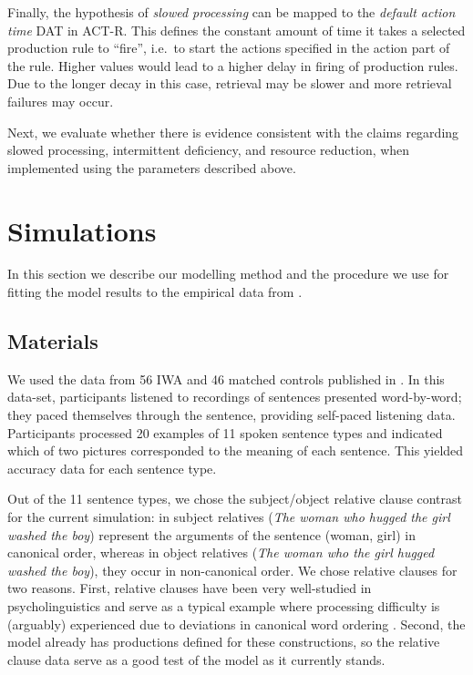\documentclass[10pt,letterpaper]{article}
\begin{document}
Finally, the hypothesis of \emph{slowed processing} can be mapped to the \emph{default action time} DAT in ACT-R. This defines the constant amount of time it takes a selected production rule to ``fire'', i.e.\ to start the actions specified in the action part of the rule. Higher values would lead to a higher delay in firing of production rules. Due to the longer decay in this case, retrieval may be slower and more retrieval failures may occur.

Next, we evaluate whether there is evidence consistent with the claims regarding slowed processing, intermittent deficiency, and resource reduction, when implemented using the parameters described above. 

\section{Simulations}

In this section we describe our modelling method and the procedure we use for fitting the model results to the empirical data from .

\subsection{Materials}

We used the data from 56 IWA and 46 matched controls published in . In this data-set, participants listened to recordings of sentences presented word-by-word; they paced themselves through the sentence, providing self-paced listening data. Participants processed 20 examples of 11 spoken sentence types and indicated which of two pictures corresponded to the meaning of each sentence. This yielded accuracy data for each sentence type. 

Out of the 11 sentence types, we chose the subject/object relative clause contrast for the current simulation:
in subject relatives (\textit{The woman who hugged the girl washed the boy}) represent the arguments of the sentence (woman, girl) in canonical order, whereas in object relatives (\textit{The woman who the girl hugged washed the boy}), they occur in non-canonical order.
We chose relative clauses for two reasons. First, relative clauses have been very well-studied in psycholinguistics and serve as a typical example where processing difficulty is (arguably) experienced due to deviations in canonical word ordering \cite{jc92}.
Second, 
the \citeauthor{LewisVasishth2005} model already has productions defined for these constructions, so the relative clause data serve as a good test of the model as it currently stands.
\end{document}
